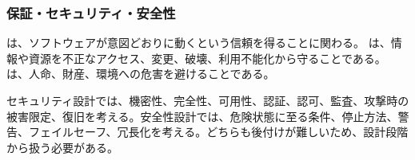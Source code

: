 \subsubsection{保証・セキュリティ・安全性}

 は、ソフトウェアが意図どおりに動くという信頼を得ることに関わる。 は、情報や資源を不正なアクセス、変更、破壊、利用不能化から守ることである。 は、人命、財産、環境への危害を避けることである。

セキュリティ設計では、機密性、完全性、可用性、認証、認可、監査、攻撃時の被害限定、復旧を考える。安全性設計では、危険状態に至る条件、停止方法、警告、フェイルセーフ、冗長化を考える。どちらも後付けが難しいため、設計段階から扱う必要がある。
